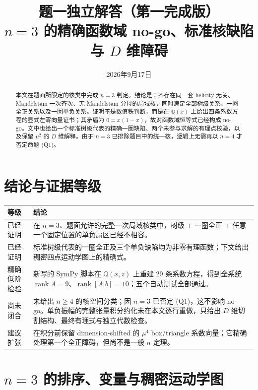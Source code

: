 \documentclass[11pt,a4paper,UTF8]{ctexart}
\title{题一独立解答（第一完成版）\\[2mm]
\large $n=3$ 的精确函数域 no-go、标准核缺陷与 $D$ 维障碍}
\author{}
\date{2026年9月17日}
\newcommand{\rank}{\operatorname{rank}}
\newcommand{\Qx}{\mathbb Q(x)}
\begin{document}
\maketitle

\begin{abstract}
本文在题面所限定的核类中完成 $n=3$ 判定。结论是：不存在同一套 helicity 无关、Mandelstam 一次齐次、无 Mandelstam 分母的局域核，同时满足全部树级关系、一圈全正关系以及一圈单负关系。证明不是数值秩判断，而是在 $\Qx$ 上给出四条系数方程的显式左零向量证书；其矛盾为 $0=x(1-x)$，故对函数域恒等式已经构成 no-go。文中也给出一个标准树级代表的精确一圈缺陷、两个未参与求解的有理点校验，以及保留 $\mu^2$ 的 $D$ 维解释。由于 $n=3$ 已排除题目中的统一核，逻辑上无需再以 $n=4$ 才否定命题 (Q1)。
\end{abstract}

\section{结论与证据等级}

\begin{center}
\begin{tabular}{>{\raggedright\arraybackslash}p{3.0cm}>{\raggedright\arraybackslash}p{10.7cm}}
\toprule
等级 & 结论\\
\midrule
已经证明 & 在 $n=3$、题面允许的完整一次局域核类中，树级 $+$ 一圈全正 $+$ 任意一个固定位置的单负扇区已经不相容。\\
已经证明 & 标准树级代表的一圈全正及三个单负缺陷均为非零有理函数；下文给出稠密四点运动学图上的精确式。\\
精确低阶检验 & 新写的 SymPy 脚本在 $\mathbb Q(x,z)$ 上重建 29 条系数方程，得到全系统 $\rank A=9$、$\rank[A|b]=10$；五个自动测试全部通过。\\
尚未闭合 & 未给出 $n\ge4$ 的核空间分类；因 $n=3$ 已否定 (Q1)，这不影响 no-go。单负振幅的完整张量积分约化未在本文逐行重做，只给出 $D$ 维切割结构、最终有理式与独立代数检查。\\
建议扩张 & 在积分前保留 dimension-shifted 的 $\mu^4$ box/triangle 系数向量；它精确处理第一个全正障碍，但尚不是一般 $n$ 定理。\\
\bottomrule
\end{tabular}
\end{center}

\section{$n=3$ 的排序、变量与稠密运动学图}
\end{document}
